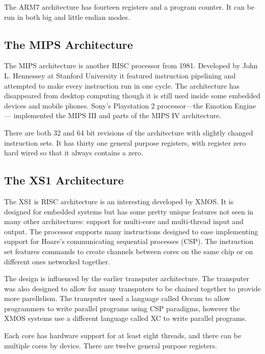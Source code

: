 \documentclass[10pt]{book}
\begin{document}
The ARM7 architecture has fourteen registers and a program counter. It
can be run in both big and little endian modes.

\subsection{The MIPS Architecture}

The MIPS architecture is another RISC processor from 1981. Developed by
John L. Hennessey at Stanford University it featured instruction
pipelining and attempted to make every instruction run in one cycle. The
architecture has disappeared from desktop computing though it is still
used inside some embedded devices and mobile
phones\autocite{Merritt:2012wy}. Sony's Playstation 2 processor---the
Emotion Engine--- implemented the MIPS III and parts of the MIPS IV
architecture.

There are both 32 and 64 bit revisions of the architecture with slightly
changed instruction sets. It has thirty one general purpose registers,
with register zero hard wired so that it always contains a zero.

\subsection{The XS1 Architecture}

The XS1 is RISC architecture is an interesting developed by XMOS. It is
designed for embedded systems but has some pretty unique features not
seen in many other architectures: support for multi-core and
multi-thread input and output. The processor supports many instructions
designed to ease implementing support for Hoare's communicating
sequential processes (CSP)\autocite{Hoare:1978ww}. The instruction set
features commands to create channels between cores on the same chip or
on different ones networked together\autocite{May:ua}.

The design is influenced by the earlier transputer architecture. The
transputer was also designed to allow for many transputers to be chained
together to provide more parellelism\autocite{May:1990kg}. The
transputer used a language called Occam to allow programmers to write
parallel programs using CSP paradigms\autocite{Gaudiot:1987wp}, however
the XMOS systems use a different language called
XC\autocite{Watt:2009ub} to write parallel programs.

Each core has hardware support for at least eight
threads\autocite{XMOS:2011tu}, and there can be multiple cores by
device. There are twelve general purpose registers.
\end{document}

